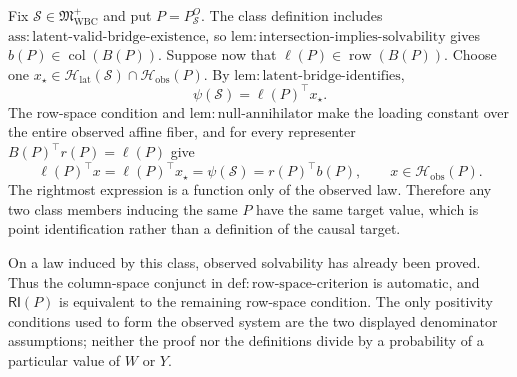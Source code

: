 Fix \(\mathcal S\in\mathfrak M_{\mathrm{WBC}}^+\) and put
\(P=P_{\mathcal S}^O\).  The class definition includes
\(\mathrm{ass{:}latent\text{-}valid\text{-}bridge\text{-}existence}\), so
\(\mathrm{lem{:}intersection\text{-}implies\text{-}solvability}\) gives
\(b(P)\in\operatorname{col}(B(P))\).  Suppose now that
\(\ell(P)\in\operatorname{row}(B(P))\).  Choose one
\(x_\star\in\mathcal H_{\mathrm{lat}}(\mathcal S)\cap
\mathcal H_{\mathrm{obs}}(P)\).  By
\(\mathrm{lem{:}latent\text{-}bridge\text{-}identifies}\),
\[
 \psi(\mathcal S)=\ell(P)^\top x_\star.
\]
The row-space condition and \(\mathrm{lem{:}null\text{-}annihilator}\) make the
loading constant over the entire observed affine fiber, and for every representer
\(B(P)^\top r(P)=\ell(P)\) give
\[
 \ell(P)^\top x=\ell(P)^\top x_\star
 =\psi(\mathcal S)=r(P)^\top b(P),
 \qquad x\in\mathcal H_{\mathrm{obs}}(P).
\]
The rightmost expression is a function only of the observed law.  Therefore any
two class members inducing the same \(P\) have the same target value, which is
point identification rather than a definition of the causal target.

On a law induced by this class, observed solvability has already been proved.
Thus the column-space conjunct in
\(\mathrm{def{:}row\text{-}space\text{-}criterion}\) is automatic, and
\(\mathsf{RI}(P)\) is equivalent to the remaining row-space condition.  The only
positivity conditions used to form the observed system are the two displayed
denominator assumptions; neither the proof nor the definitions divide by a
probability of a particular value of \(W\) or \(Y\).